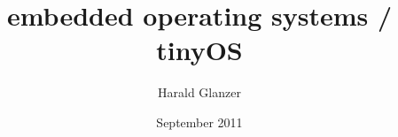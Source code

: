 
\title{embedded operating systems / tinyOS}
\author{Harald Glanzer}
\address{Hardtgasse 25 / 12A, 1190 Wien}
\date{September 2011}


